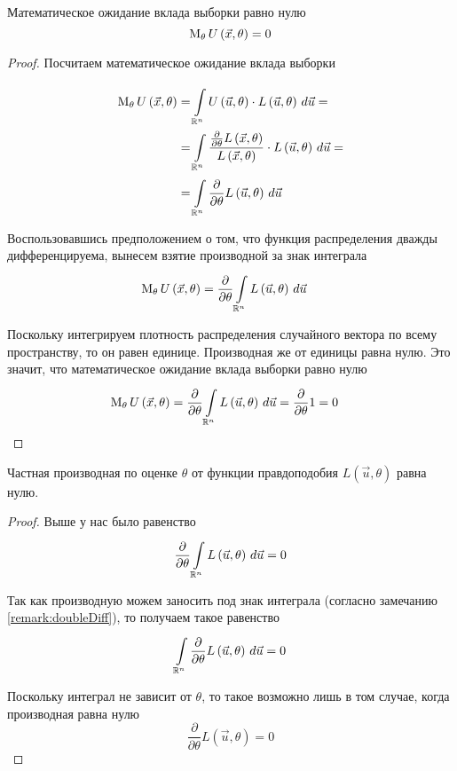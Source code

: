\begin{remark}
     Математическое ожидание вклада выборки равно нулю
    $$\meanof{\theta}{U\left( \vec{x},\theta \right)}=0$$
\end{remark}
\begin{proof}
Посчитаем математическое ожидание вклада выборки

\begin{align*}
    \meanof{\theta}{U\left( \vec{x},\theta \right)}
        &=\integral{\mathbb{R}^n}{}{\vec{u}}
            {U\left( \vec{u},\theta \right)
                \cdot L\left( \vec{u},\theta \right)}=\\
        &=\integral{\mathbb{R}^n}{}{\vec{u}}
            {\frac{\frac{\partial}{\partial\theta}L\left(\vec{x},\theta\right)}
                {L\left(\vec{x},\theta\right)}
                \cdot L\left( \vec{u},\theta \right)}=\\
        &=\integral{\mathbb{R}^n}{}{\vec{u}}
            {\frac{\partial}{\partial\theta}
                L\left( \vec{u},\theta \right)}
\end{align*}

Воспользовавшись предположением о том,
что функция распределения дважды дифференцируема,
вынесем взятие производной за знак интеграла
\begin{align*}
    \meanof{\theta}{U\left( \vec{x},\theta \right)}
        &=\frac{\partial}{\partial\theta}
            \integral{\mathbb{R}^n}{}{\vec{u}}{L\left( \vec{u},\theta \right)}
\end{align*}

Поскольку интегрируем плотность распределения случайного вектора
по всему пространству, то он равен единице.
Производная же от единицы равна нулю.
Это значит, что математическое ожидание вклада выборки равно нулю
\begin{align*}
    \meanof{\theta}{U\left( \vec{x},\theta \right)}
        &=\frac{\partial}{\partial\theta}
            \integral{\mathbb{R}^n}{}{\vec{u}}{L\left( \vec{u},\theta \right)}
        =\frac{\partial}{\partial\theta}1
        =0
\end{align*}
\end{proof}
\begin{remark}\label{remark:partialLikelihoodNull}
    Частная производная по оценке $\theta$ от функции правдоподобия
    $L\left( \vec{u},\theta \right)$ равна нулю.
\end{remark}
\begin{proof}
    Выше у нас было равенство
    $$\frac{\partial}{\partial\theta}
        \integral{\mathbb{R}^n}{}{\vec{u}}{L\left( \vec{u},\theta \right)}=0$$

    Так как производную можем заносить под знак интеграла
    (согласно замечанию \ref{remark:doubleDiff}), то получаем такое равенство
    $$\integral{\mathbb{R}^n}{}{\vec{u}}{
        \frac{\partial}{\partial\theta}L\left( \vec{u},\theta \right)}=0$$

    Поскольку интеграл не зависит от $\theta$,
    то такое возможно лишь в том случае, когда производная равна нулю
    $$\frac{\partial}{\partial\theta}L\left( \vec{u},\theta \right)=0$$
\end{proof}

